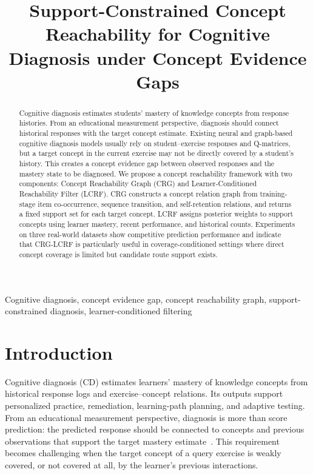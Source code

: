 \documentclass[conference]{IEEEtran}
\title{Support-Constrained Concept Reachability for Cognitive Diagnosis under Concept Evidence Gaps}
\author{
\IEEEauthorblockN{Anonymous Author(s)}
\IEEEauthorblockA{Anonymous Affiliation\\
Email: anonymous@example.com}
}
\begin{document}
\maketitle

\begin{abstract}
Cognitive diagnosis estimates students' mastery of knowledge concepts from response histories. From an educational measurement perspective, diagnosis should connect historical responses with the target concept estimate. Existing neural and graph-based cognitive diagnosis models usually rely on student--exercise responses and Q-matrices, but a target concept in the current exercise may not be directly covered by a student's history. This creates a concept evidence gap between observed responses and the mastery state to be diagnosed. We propose a concept reachability framework with two components: Concept Reachability Graph (CRG) and Learner-Conditioned Reachability Filter (LCRF). CRG constructs a concept relation graph from training-stage item co-occurrence, sequence transition, and self-retention relations, and returns a fixed support set for each target concept. LCRF assigns posterior weights to support concepts using learner mastery, recent performance, and historical counts. Experiments on three real-world datasets show competitive prediction performance and indicate that CRG-LCRF is particularly useful in coverage-conditioned settings where direct concept coverage is limited but candidate route support exists.
\end{abstract}

\begin{IEEEkeywords}
Cognitive diagnosis, concept evidence gap, concept reachability graph, support-constrained diagnosis, learner-conditioned filtering
\end{IEEEkeywords}

\section{Introduction}
Cognitive diagnosis (CD) estimates learners' mastery of knowledge concepts from historical response logs and exercise--concept relations. Its outputs support personalized practice, remediation, learning-path planning, and adaptive testing. From an educational measurement perspective, diagnosis is more than score prediction: the predicted response should be connected to concepts and previous observations that support the target mastery estimate~\cite{pellegrino2001knowing,mislevy2003structure}. This requirement becomes challenging when the target concept of a query exercise is weakly covered, or not covered at all, by the learner's previous interactions.
\end{document}
